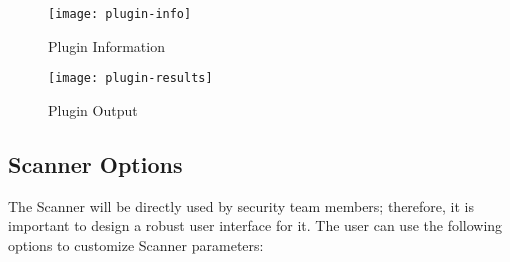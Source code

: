\begin{figure}[h!]
\label{figure:plugin-info}
  \centering
    \texttt{[image: plugin-info]}
  \caption{Plugin Information}
  
\end{figure}

\begin{figure}[h!]
\label{figure:plugin-results}
  \centering
    \texttt{[image: plugin-results]}
  \caption{Plugin Output}
  
\end{figure}



\subsection{Scanner Options}
The Scanner will be directly used by security team members; therefore, it is important to design a robust user interface for it. The user can use the following options to customize Scanner parameters:

